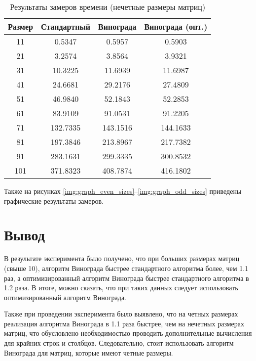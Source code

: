 \begin{table}[h]
    \begin{center}
        \begin{threeparttable}
        \captionsetup{justification=raggedright,singlelinecheck=off}
        \caption{Результаты замеров времени (нечетные размеры матриц)}
        \label{tbl:time_mes_odd}
        \begin{tabular}{|c|c|c|c|}
            \hline
            Размер & Стандартный & Винограда & Винограда (опт.) \\
            \hline
            11 & 0.5347 & 0.5957 & 0.5903 \\
            \hline
            21 & 3.2574 & 3.8564 & 3.9321 \\
            \hline
            31 & 10.3225 & 11.6939 & 11.6987 \\
            \hline
            41 & 24.6681 & 29.2176 & 27.4809 \\
            \hline
            51 & 46.9840 & 52.1843 & 52.2853 \\
            \hline
            61 & 83.9109 & 91.0531 & 91.2205 \\
            \hline
            71 & 132.7335 & 143.1516 & 144.1633 \\
            \hline
            81 & 197.3846 & 213.8967 & 217.7382 \\
            \hline
            91 & 283.1631 & 299.3335 & 300.8532 \\
            \hline
            101 & 371.8323 & 408.7874 & 416.1802 \\
            \hline
		\end{tabular}
    \end{threeparttable}
\end{center}
\end{table}

Также на рисунках \ref{img:graph_even_sizes}--\ref{img:graph_odd_sizes} приведены графические результаты замеров.

\clearpage


\section{Вывод}

В результате эксперимента было получено, что при больших размерах матриц (свыше 10), алгоритм Винограда быстрее стандартного алгоритма более, чем 1.1 раз, а оптимизированный алгоритм Винограда быстрее стандартного алгоритма в 1.2 раза. В итоге, можно сказать, что при таких данных следует использовать оптимизированный алгоритм Винограда.

Также при проведении эксперимента было выявлено, что на четных размерах реализация алгоритма Винограда в 1.1 раза быстрее, чем на нечетных размерах матриц, что обусловлено необходимостью проводить дополнительные вычисления для крайних строк и столбцов.  Следовательно, стоит использовать алгоритм Винограда для матриц, которые имеют четные размеры.
